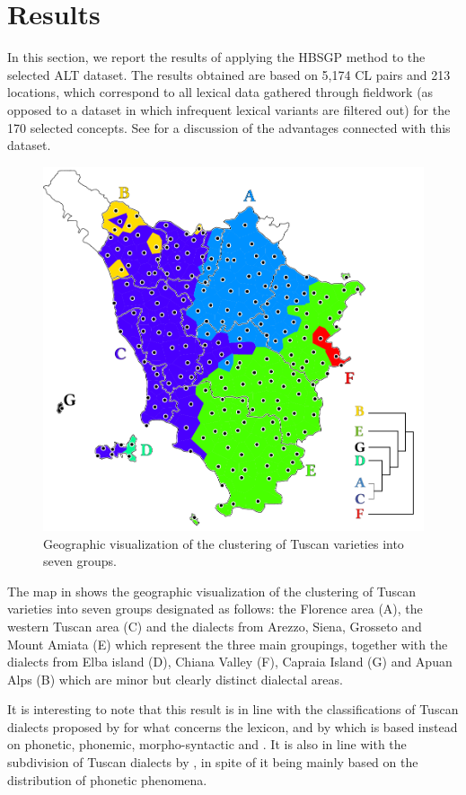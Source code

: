 \documentclass[output=paper]{LSP/langsci}
\begin{document}
\section{Results}
In this section, we report the results of applying the HBSGP method to the selected ALT dataset. The results obtained are based on 5,174 CL pairs and 213 locations, which correspond to all lexical data gathered through fieldwork (as opposed to a dataset in which infrequent lexical variants are filtered out) for the 170 selected concepts. See \citet{wieling_infrequent_2015} for a discussion of the advantages connected with this dataset. 

\begin{figure}[b]
\includegraphics[width=.8\textwidth]{illustrations/monte_wiel_fig1_v2} 
\caption{Geographic visualization of the clustering of Tuscan varieties into seven groups.} 
\label{fig:monte:1}
\end{figure}

The map in  shows the geographic visualization of the clustering of Tuscan varieties into seven groups designated as follows: the Florence area (A), the western Tuscan area (C) and the dialects from Arezzo, Siena, Grosseto and Mount Amiata (E) which represent the three main groupings, together with the dialects from Elba island (D), Chiana Valley (F), Capraia Island (G) and Apuan Alps (B) which are minor but clearly distinct dialectal areas.



It is interesting to note that this result is in line with the classifications of Tuscan dialects proposed by \citet{giacomelli_aree_1975} for what concerns the lexicon, and by \citet{giannelli_toscana_1976} which is based instead on phonetic, phonemic, morpho-syntactic and . It is also in line with the subdivision of Tuscan dialects by \citet{pellegrini_carta_1977}, in spite of it being mainly based on the distribution of phonetic phenomena.
\end{document}
